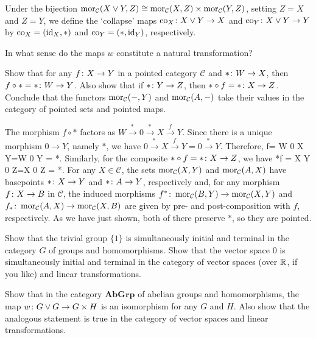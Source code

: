 \item Under the bijection $\operatorname{mor}_{\mathcal{C}}(X\lor Y,Z) \cong\operatorname{mor}_{\mathcal{C}}(X,Z) \times \operatorname{mor}_{\mathcal{C}}(Y, Z)$, setting $Z=X$ and $Z=Y$, we define the `collapse' maps $\mathrm{co}_X\colon X\lor Y\to X$ and $\mathrm{co}_Y\colon X\lor Y\to Y$ by $\mathrm{co}_X=(\mathrm{id}_X,*)$ and $\mathrm{co}_Y=(*,\mathrm{id}_Y)$, respectively.
\een
\es

\bx
In what sense do the maps $w$ constitute a natural transformation?
\ex

\bs
\es

\bp
Show that for any $f\colon X \to Y$ in a pointed category $\mathcal{C}$ and $*\colon W\to X$, then $f\circ * = *\colon W\to Y$. Also show that if $*\colon Y\to Z$, then $*\circ f=*\colon X\to Z$. Conclude that the functors $\operatorname{mor}_{\mathcal{C}}(-,Y)$ and $\operatorname{mor}_{\mathcal{C}}(A,-)$ take their values in the category of pointed sets and pointed maps.
\ep

\bs
The morphism $f\circ *$ factors as $W\xrightarrow{*\, } 0 \xrightarrow{*\, } X\xrightarrow{f\, } Y$. Since there is a unique morphism $0\to Y$, namely $*$, we have $0 \xrightarrow{*\, } X\xrightarrow{f\, } Y=0 \xrightarrow{*\, }Y$. Therefore,
\bse
f\circ * = W\xrightarrow{*\, } 0 \xrightarrow{*\, } X Y=W\xrightarrow{*\, } 0 \xrightarrow{*\, }  Y = *.
\ese
Similarly, for the composite $*\circ f=*\colon X\to Z$, we have
\bse
*\circ f = X Y\xrightarrow{*\, } 0 \xrightarrow{*\, } Z=X\xrightarrow{*\, } 0 \xrightarrow{*\, }  Z = *.
\ese
For any $X\in\mathcal{C}$, the sets $\operatorname{mor}_{\mathcal{C}}(X,Y)$ and $\operatorname{mor}_{\mathcal{C}}(A,X)$ have basepoints $*\colon X\to Y$ and $*\colon A\to Y$, respectively and, for any morphism $f\colon X\to B$ in $\mathcal{C}$, the induced morphisms $f^*\colon\operatorname{mor}_{\mathcal{C}}(B,Y)\to \operatorname{mor}_{\mathcal{C}}(X,Y)$ and $f_*\colon\operatorname{mor}_{\mathcal{C}}(A,X)\to\operatorname{mor}_{\mathcal{C}}(X,B)$ are given by pre- and post-composition with $f$, respectively. As we have just shown, both of there preserve $*$, so they are pointed.
\es

\bx
\ben[label=(\alph*)]
\item Show that the trivial group $\{1\}$ is simultaneously initial and terminal in the category $G$ of groups and homomorphisms. Show that the vector space $0$ is simultaneously initial and terminal in the category of vector spaces (over $\mathbb{R}$, if you like) and linear transformations.
\item Show that in the category $\mathbf{AbGrp}$ of abelian groups and homomorphisms, the map $w \colon G \lor G \to G \times H$ is an isomorphism for any $G$ and $H$.
Also show that the analogous statement is true in the category of vector spaces and linear transformations.
\een
\ex

